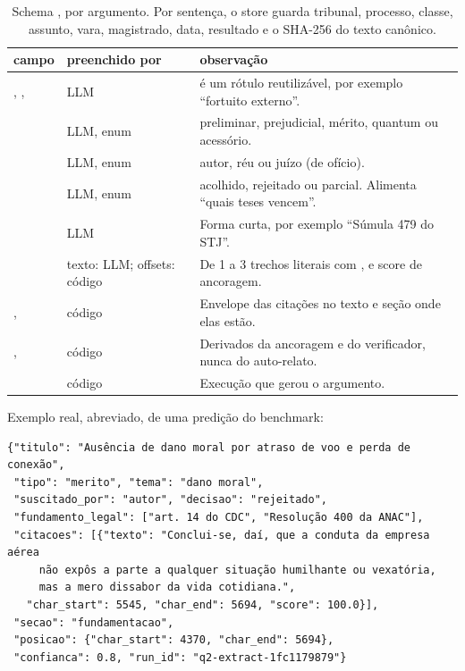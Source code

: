 \documentclass[11pt,a4paper]{article}
\newcommand{\cfg}[1]{\texttt{\detokenize{#1}}}
\begin{document}
\begin{table}[H]
\centering
\small
\begin{tabular}{p{3.6cm}p{2.6cm}p{7.6cm}}
\toprule
campo & preenchido por & observação \\
\midrule
\cfg{titulo}, \cfg{resumo}, \cfg{tema} & LLM & \cfg{tema} é um rótulo reutilizável, por exemplo ``fortuito externo''. \\
\cfg{tipo} & LLM, enum & preliminar, prejudicial, mérito, quantum ou acessório. \\
\cfg{suscitado_por} & LLM, enum & autor, réu ou juízo (de ofício). \\
\cfg{decisao} & LLM, enum & acolhido, rejeitado ou parcial. Alimenta ``quais teses vencem''. \\
\cfg{fundamento_legal[]} & LLM & Forma curta, por exemplo ``Súmula 479 do STJ''. \\
\cfg{citacoes[]} & texto: LLM; offsets: código & De 1 a 3 trechos literais com \cfg{char_start}, \cfg{char_end} e score de ancoragem. \\
\cfg{posicao}, \cfg{secao} & código & Envelope das citações no texto e seção onde elas estão. \\
\cfg{confianca}, \cfg{sinais} & código & Derivados da ancoragem e do verificador, nunca do auto-relato. \\
\cfg{run_id} & código & Execução que gerou o argumento. \\
\bottomrule
\end{tabular}
\caption{Schema \cfg{q2-extracted-v2}, por argumento. Por sentença, o store guarda tribunal,
processo, classe, assunto, vara, magistrado, data, resultado e o SHA-256 do texto canônico.}
\label{tab:schema}
\end{table}

\noindent Exemplo real, abreviado, de uma predição do benchmark:
{\small
\begin{verbatim}
{"titulo": "Ausência de dano moral por atraso de voo e perda de conexão",
 "tipo": "merito", "tema": "dano moral",
 "suscitado_por": "autor", "decisao": "rejeitado",
 "fundamento_legal": ["art. 14 do CDC", "Resolução 400 da ANAC"],
 "citacoes": [{"texto": "Conclui-se, daí, que a conduta da empresa aérea
     não expôs a parte a qualquer situação humilhante ou vexatória,
     mas a mero dissabor da vida cotidiana.",
   "char_start": 5545, "char_end": 5694, "score": 100.0}],
 "secao": "fundamentacao",
 "posicao": {"char_start": 4370, "char_end": 5694},
 "confianca": 0.8, "run_id": "q2-extract-1fc1179879"}
\end{verbatim}
}
\end{document}
